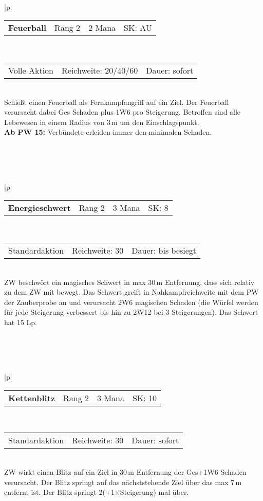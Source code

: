 \documentclass[../../Heldenanleitung2]{subfiles}
\begin{document}
\\\\\\
\begin{tabular}{|p{\textwidth}|}
\hline
\begin{tabularx}{\textwidth}{X|X|X|X}
\textbf{Feuerball} & Rang 2 & 2 Mana & SK: AU
\end{tabularx} \\ \hline
\begin{tabularx}{\textwidth}{X|X|X}
Volle Aktion & Reichweite: 20/40/60 & Dauer: sofort
\end{tabularx} \\ \hline
Schießt einen Feuerball als Fernkampfangriff auf ein Ziel. Der Feuerball verursacht dabei Ges Schaden plus 1W6 pro Steigerung. Betroffen sind alle Lebewesen in einem Radius von 3\,m um den Einschlagspunkt.\\
\textbf{Ab PW 15:} Verbündete erleiden immer den minimalen Schaden.
\\ \hline
\end{tabular}
\\\\\\
\begin{tabular}{|p{\textwidth}|}
\hline
\begin{tabularx}{\textwidth}{X|X|X|X}
\textbf{Energieschwert} & Rang 2 & 3 Mana & SK: 8
\end{tabularx} \\ \hline
\begin{tabularx}{\textwidth}{X|X|X}
Standardaktion & Reichweite: 30 & Dauer: bis besiegt
\end{tabularx} \\ \hline
ZW beschwört ein magisches Schwert in max 30\,m Entfernung, dass sich relativ zu dem ZW mit bewegt. Das Schwert greift in Nahkampfreichweite mit dem PW der Zauberprobe an und verursacht 2W6 magischen Schaden (die Würfel werden für jede Steigerung verbessert bis hin zu 2W12 bei 3 Steigerungen). Das Schwert hat 15 Lp.
\\ \hline
\end{tabular}
\\\\\\
\begin{tabular}{|p{\textwidth}|}
\hline
\begin{tabularx}{\textwidth}{X|X|X|X}
\textbf{Kettenblitz} & Rang 2 & 3 Mana & SK: 10
\end{tabularx} \\ \hline
\begin{tabularx}{\textwidth}{X|X|X}
Standardaktion & Reichweite: 30 & Dauer: sofort
\end{tabularx} \\ \hline
ZW wirkt einen Blitz auf ein Ziel in 30\,m Entfernung der Ges+1W6 Schaden verursacht. Der Blitz springt auf das nächststehende Ziel über das max 7\,m entfernt ist. Der Blitz springt 2(+1$\times$Steigerung) mal über. 
\\ \hline
\end{tabular}
\end{document}
